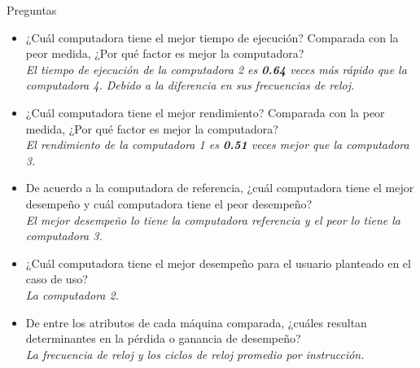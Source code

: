 \documentclass[12pt, letterpaper, twoside]{article}
\begin{document}
\begin{description}
  \item[Preguntas] 
\end{description}
\begin{itemize}
  \item ¿Cuál computadora tiene el mejor tiempo de ejecución? Comparada con la peor medida, ¿Por qué factor es mejor la computadora? \\ \textit{El tiempo de ejecución de la computadora 2 es \textbf{0.64} veces más rápido que la computadora 4. Debido a la diferencia en sus frecuencias de reloj.}
\end{itemize}
\begin{itemize}
  \item ¿Cuál computadora tiene el mejor rendimiento? Comparada con la peor medida, ¿Por qué factor es mejor la computadora? \\ \textit{El rendimiento de la computadora 1 es \textbf{0.51} veces mejor que la computadora 3.}
\end{itemize}
\begin{itemize}
  \item De acuerdo a la computadora de referencia, ¿cuál computadora tiene el mejor desempeño y cuál computadora tiene el peor desempeño? \\ \textit{El mejor desempeño lo tiene la computadora referencia y el peor lo tiene la computadora 3.}
\end{itemize}
\begin{itemize}
  \item ¿Cuál computadora tiene el mejor desempeño para el usuario planteado en el caso de uso? \\ \textit{La computadora 2.}
\end{itemize}
\begin{itemize}
  \item De entre los atributos de cada máquina comparada, ¿cuáles resultan determinantes en la pérdida o ganancia de desempeño? \\ \textit{La frecuencia de reloj y los ciclos de reloj promedio por instrucción.}
\end{itemize}
\end{document}
